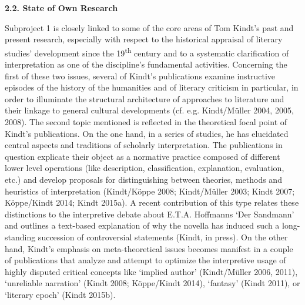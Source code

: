 
\vspace{.2cm}
\noindent\textbf{\large 2.2. State of Own Research}
\vspace{.2cm}

Subproject 1 is closely linked to some of the core areas of Tom Kindt's past and present research, especially with respect to the historical appraisal of literary studies' development since the 19\textsuperscript{th} century and to a systematic clarification of interpretation as one of the discipline's fundamental activities. Concerning the first of these two issues, several of Kindt's publications examine instructive episodes of the history of the humanities and of literary criticism in particular, in order to illuminate the structural architecture of approaches to literature and their linkage to general cultural developments (cf. e.g. Kindt/M\"uller 2004, 2005, 2008). The second topic mentioned is reflected in the theoretical focal point of Kindt's publications. On the one hand, in a series of studies, he has elucidated central aspects and traditions of scholarly interpretation. The publications in question explicate their object as a normative practice composed of different lower level operations (like description, classification, explanation, evaluation, etc.) and develop proposals for distinguishing between theories, methods and heuristics of interpretation (Kindt/K\"oppe 2008; Kindt/M\"uller 2003; Kindt 2007; K\"oppe/Kindt 2014; Kindt 2015a). A recent contribution of this type relates these distinctions to the interpretive debate about E.T.A. Hoffmanns `Der Sandmann' and outlines a text-based explanation of why the novella has induced such a long-standing succession of controversial statements (Kindt, in press). On the other hand, Kindt's emphasis on meta-theoretical issues becomes manifest in a couple of publications that analyze and attempt to optimize the interpretive usage of highly disputed critical concepts like `implied author' (Kindt/M\"uller 2006, 2011), `unreliable narration' (Kindt 2008; K\"oppe/Kindt 2014), `fantasy' (Kindt 2011), or `literary epoch' (Kindt 2015b).


